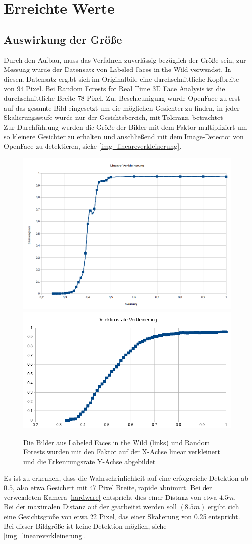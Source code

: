 \section{Erreichte Werte}
\subsection{Auswirkung der Größe}
Durch den Aufbau, muss das Verfahren zuverlässig bezüglich der Größe sein, zur Messung wurde der Datensatz von Labeled Faces in the Wild \cite{database_Face} verwendet. In diesem Datensatz ergibt sich im Originalbild eine durchschnittliche Kopfbreite von 94 Pixel. Bei Random Forests for Real Time 3D Face Analysis \cite{database_Face_Ori} ist die durchschnittliche Breite 78 Pixel. Zur Beschleunigung wurde OpenFace zu erst auf das gesamte Bild eingesetzt um die möglichen Gesichter zu finden, in jeder Skalierungsstufe wurde nur der Gesichtsbereich, mit Toleranz, betrachtet\\
Zur Durchführung wurden die Größe der Bilder mit dem Faktor multipliziert um so kleinere Gesichter zu erhalten und anschließend mit dem Image-Detector von OpenFace zu detektieren, siehe \autoref{img_lineareverkleinerung}.\\
\begin{figure}
	\centering
	\includegraphics[width=0.45\linewidth]{img/lineare_Verkleinerung}
	\includegraphics[width=0.45\linewidth]{img/lineare_Verkleinerung2}
	\caption{Die Bilder aus Labeled Faces in the Wild \cite{database_Face} (links) und Random Forests \cite{database_Face_Ori} wurden mit den Faktor auf der X-Achse linear verkleinert und die Erkennungsrate Y-Achse abgebildet}
	\label{img_lineareverkleinerung}
\end{figure}
Es ist zu erkennen, dass die Wahrscheinlichkeit auf eine erfolgreiche Detektion ab $0.5$, also etwa Gesichert mit 47 Pixel Breite, rapide abnimmt. Bei der verwendeten Kamera \autoref{hardware} entspricht dies einer Distanz von etwa $4.5m$.\\
Bei der maximalen Distanz auf der gearbeitet werden soll $(8.5m)$ ergibt sich eine Gesichtsgröße von etwa 22 Pixel, das einer Skalierung von 0.25 entspricht. Bei dieser Bildgröße ist keine Detektion möglich, siehe \autoref{img_lineareverkleinerung}.
